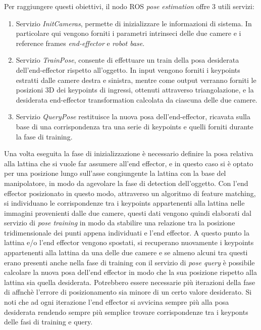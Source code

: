 \documentclass[english]{article}
\begin{document}
Per raggiungere questi obiettivi, il nodo ROS \textit{pose} \textit{estimation} offre 3 utili servizi:
\begin{enumerate}
\item Servizio \textit{InitCameras}, permette di inizializzare le informazioni di sistema. In particolare qui vengono forniti i parametri intrinseci delle due camere e i reference frames \textit{end-effector} e \textit{robot base}.   
\item Servizio \textit{TrainPose}, consente di effettuare un train della posa desiderata dell'end-effector rispetto all'oggetto. In input vengono forniti i keypoints estratti dalle camere destra e sinistra, mentre come output verranno forniti le posizioni 3D dei keypoints di ingressi, ottenuti attraverso triangolazione, e la desiderata end-effector transformation calcolata da ciascuna delle due camere.
\item Servizio \textit{QueryPose} restituisce la nuova posa dell'end-effector, ricavata sulla base di una corrispondenza tra una serie di keypoints e quelli forniti durante la fase di training.

\end{enumerate}
Una volta eseguita la fase di inizializzazione è necessario definire la posa relativa alla lattina che si vuole far assumere all'end effector, e in questo caso si è optato per una posizione lungo sull'asse congiungente la lattina con la base del manipolatore, in modo da agevolare la fase di detection dell'oggetto. Con l'end effector posizionato in questo modo, attraverso un algoritmo di feature matching, si individuano le corrispondenze tra i keypoints appartenenti alla lattina nelle immagini provenienti dalle due camere, questi dati vengono quindi elaborati dal servizio di \textit{pose training} in modo da stabilire una relazione tra la posizione tridimensionale dei punti appena individuati e l'end effector. A questo punto la lattina e/o l'end effector vengono spostati, si recuperano nuovamente i keypoints appartenenti alla lattina da una delle due camere e se almeno alcuni tra questi erano presenti anche nella fase di training con il servizio di \textit{pose query} è possibile calcolare la nuova posa dell'end effector in modo che la sua posizione rispetto alla lattina sia quella desiderata. Potrebbero essere necessarie più iterazioni della fase di  affnchè l'errore di posizionamento sia minore di un certo valore desiderato. Si noti che ad ogni iterazione l'end effector si avvicina sempre più alla posa desiderata rendendo sempre più semplice trovare corrispondenze tra i keyponts delle fasi di training e query.
\end{document}
